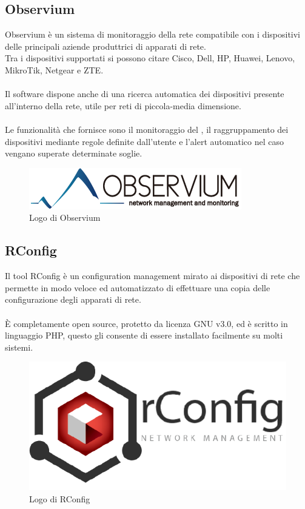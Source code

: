 \documentclass[Tesi.tex]{subfiles}
\begin{document}
\subsection{Observium}
Observium è un sistema di monitoraggio della rete compatibile con i dispositivi delle principali aziende produttrici di apparati di rete. \\
Tra i dispositivi supportati si possono citare Cisco, Dell, HP, Huawei, Lenovo, MikroTik, Netgear e ZTE. \\\\
Il software dispone anche di una ricerca automatica dei dispositivi presente all'interno della rete, utile per reti di piccola-media dimensione. \\\\
Le funzionalità che fornisce sono il monitoraggio del , il raggruppamento dei dispositivi mediante regole definite dall'utente e l'alert automatico nel caso vengano superate determinate soglie.
\begin{figure}[H]
	\centering
	\includegraphics[width=0.56\linewidth]{"images/logo/Observium_logo"}
	\caption{Logo di Observium}
	\label{fig:Logo di Observium}
\end{figure}

\subsection{RConfig}
Il tool RConfig è un configuration management mirato ai dispositivi di rete che permette in modo veloce ed automatizzato di effettuare una copia delle configurazione degli apparati di rete. \\\\
\`{E} completamente open source, protetto da licenza GNU v3.0, ed è scritto in linguaggio PHP, questo gli consente di essere installato facilmente su molti sistemi.
\begin{figure}[H]
	\centering
	\includegraphics[width=0.5\linewidth]{"images/logo/rConfig_logo"}
	\caption{Logo di RConfig}
	\label{fig:Logo di RConfig}
\end{figure}
\end{document}
